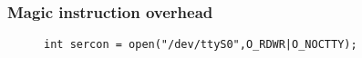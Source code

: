 
\begin{frame}[fragile]
\frametitle{Magic instruction overhead}
\begin{figure}
\centering
\begin{lstlisting}
int sercon = open("/dev/ttyS0",O_RDWR|O_NOCTTY);
\end{lstlisting}
\begin{minipage}{.5\textwidth}
	\centering
	

\end{minipage}%
\begin{minipage}{.5\textwidth}
	\centering


\end{minipage}
\end{figure}

\begin{center}

\end{center}

\end{frame}
